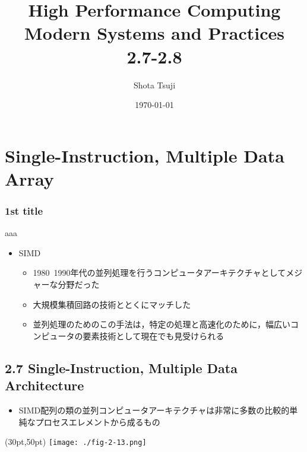 \documentclass[12pt, unicode, dvipdfmx]{beamer}
\begin{document}
\title[group-reading]{High Performance Computing\\Modern Systems and Practices\\2.7-2.8}
\author{Shota Tsuji}
\date{\today}

\begin{frame}
	\titlepage
\end{frame}

\begin{frame}
	\tableofcontents
\end{frame}

\section{Single-Instruction, Multiple Data Array}
\begin{frame}[t]
	\frametitle{1st title}
	aaa
	\begin{itemize}
		\item SIMD
		\begin{itemize}
			\item 1980~1990年代の並列処理を行うコンピュータアーキテクチャとしてメジャーな分野だった
			\item 大規模集積回路の技術ととくにマッチした
			\item 並列処理のためのこの手法は，特定の処理と高速化のために，幅広いコンピュータの要素技術として現在でも見受けられる
		\end{itemize}
	\end{itemize}
\end{frame}

\subsection{2.7 Single-Instruction, Multiple Data Architecture}
\begin{frame}[t]
	\begin{itemize}
		\item SIMD配列の類の並列コンピュータアーキテクチャは非常に多数の比較的単純なプロセスエレメントから成るもの
	\end{itemize}
	\begin{textblock*}{0.8\linewidth}(30pt,50pt)
		\centering
		\texttt{[image: ./fig-2-13.png]}
	\end{textblock*}

\end{frame}
\end{document}
